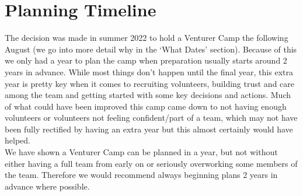 \section{Planning Timeline}
The decision was made in summer 2022 to hold a Venturer Camp the following August (we go into more detail why in the `What Dates' section). Because of this we only had a year to plan the camp when preparation usually starts around 2 years in advance. While most things don't happen until the final year, this extra year is pretty key when it comes to recruiting volunteers, building trust and care among the team and getting started with some key decisions and actions. Much of what could have been improved this camp came down to not having enough volunteers or volunteers not feeling confident/part of a team, which may not have been fully rectified by having an extra year but this almost certainly would have helped.\\

We have shown a Venturer Camp can be planned in a year, but not without either having a full team from early on or seriously overworking some members of the team. Therefore we would recommend always beginning plans 2 years in advance where possible.
